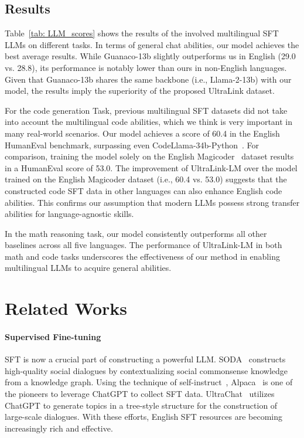\documentclass[11pt]{article}
\begin{document}
\subsection{Results}

Table~\ref{tab: LLM_scores} shows the results of the involved multilingual SFT LLMs on different tasks. In terms of general chat abilities, our model achieves the best average results. While Guanaco-13b slightly outperforms us in English (29.0 vs. 28.8), its performance is notably lower than ours in non-English languages. Given that Guanaco-13b shares the same backbone (i.e., Llama-2-13b) with our model, the results imply the superiority of the proposed UltraLink dataset.

For the code generation Task, previous multilingual SFT datasets did not take into account the multilingual code abilities, which we think is very important in many real-world scenarios. Our model achieves a score of 60.4 in the English HumanEval benchmark, surpassing even CodeLlama-34b-Python~\cite{codellama}. For comparison, training the model solely on the English Magicoder~\cite{wei2023magicoder} dataset results in a HumanEval score of 53.0. The improvement of UltraLink-LM over the model trained on the English Magicoder dataset (i.e., 60.4 vs. 53.0) suggests that the constructed code SFT data in other languages can also enhance English code abilities. This confirms our assumption that modern LLMs possess strong transfer abilities for language-agnostic skills.

In the math reasoning task, our model consistently outperforms all other baselines across all five languages. The performance of UltraLink-LM in both math and code tasks underscores the effectiveness of our method in enabling multilingual LLMs to acquire general abilities.

\section{Related Works}
\paragraph{Supervised Fine-tuning} SFT is now a crucial part of constructing a powerful LLM. SODA~\cite{kim-etal-2023-soda} constructs high-quality social dialogues by contextualizing social commonsense knowledge from a knowledge graph. Using the technique of self-instruct~\cite{wang-etal-2023-self-instruct}, Alpaca~\cite{alpaca} is one of the pioneers to leverage ChatGPT to collect SFT data. 
UltraChat~\cite{ding-etal-2023-enhancing} utilizes ChatGPT to generate topics in a tree-style structure for the construction of large-scale dialogues. With these efforts, English SFT resources are becoming increasingly rich and effective.
\end{document}
